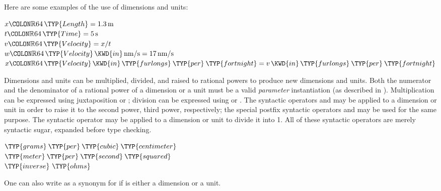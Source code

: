 Here are some examples of the use of dimensions and units:
\begin{Fortress}
\(x\COLON \mathbb{R}64\,\TYP{Length} = 1.3\,\mathrm{m}\)\\
\(t\COLON \mathbb{R}64\,\TYP{Time} = 5\,\mathrm{s}\)\\
\(v\COLON \mathbb{R}64\,\TYP{Velocity} = x / t\)\\
\(w\COLON \mathbb{R}64\,\TYP{Velocity}\, \KWD{in}\, \mathrm{nm}/\mathrm{s} = 17\,\mathrm{nm}/\mathrm{s}\)\\
\(x\COLON \mathbb{R}64\,\TYP{Velocity}\, \KWD{in}\, \TYP{furlongs} \mathbin{\TYP{per}} \TYP{fortnight} = v\, \KWD{in}\, \TYP{furlongs} \mathbin{\TYP{per}} \TYP{fortnight}\)
\end{Fortress}



Dimensions and units can be multiplied, divided, and raised to rational powers to produce new dimensions and units. Both the numerator and the denominator of a rational power of a dimension or a unit must be a valid \emph{ parameter} instantiation
(as described in ).
Multiplication can be expressed using juxtaposition or \EXP{\cdot};
division can be expressed using \EXP{/} or .
The syntactic operators  and  may be applied to a dimension or unit in order to raise
it to the second power, third power, respectively; the special postfix syntactic operators 
and  may be used for the same purpose.
The syntactic operator  may be applied to a dimension or unit to divide it into 1.
All of these syntactic operators are merely syntactic sugar, expanded before type checking.

\begin{Fortress}
\(\TYP{grams} \mathbin{\TYP{per}} \mathbin{\TYP{cubic}}\mskip 4mu plus 4mu\TYP{centimeter} \)\\
\(\TYP{meter} \mathbin{\TYP{per}} \TYP{second}\mskip 4mu plus 4mu\TYP{squared} \)\\
\(\mathbin{\TYP{inverse}}\ \TYP{ohms}\)
\end{Fortress}

One can also write  as a synonym for  if
 is either a dimension or a unit.


